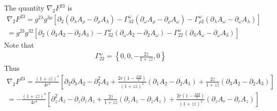 \documentclass[12pt]{article}
\def\nn{\nonumber}
\begin{document}
The quantity $\nabla_{2} F^{23}$ is
\begin{gather}
\nabla_{2}F^{23}
=
g^{2 \lambda} g^{3 \rho}
\left[
\partial_{2} 
(\partial_{\lambda}A_{\rho}
-
\partial_{\rho}A_{\lambda})
-
\Gamma_{\lambda 2}^{\omega} 
(\partial_{\omega} A_{\rho}
-
\partial_{\rho} A_{\omega})
-
\Gamma_{\rho 2}^{\omega}
(\partial_{\lambda} A_{\omega}
-
\partial_{\omega} A_{\lambda})
\right]
\nn \\
=
g^{23} g^{32}
\left[
\partial_{2} 
(\partial_{3}A_{2}
-
\partial_{2}A_{3})
-
\Gamma_{3 2}^{\omega} 
(\partial_{\omega} A_{2}
-
\partial_{2} A_{\omega})
-
\Gamma_{22}^{\omega}
(\partial_{3} A_{\omega}
-
\partial_{\omega} A_{3})
\right]
\end{gather}
Note that
\begin{gather}
\Gamma^{\omega}_{22}
=
\left\{
0,0,-\frac{2 \bar{z}}{1 + z \bar{z}},0
\right\}
\end{gather}
Thus
\begin{gather}
\nabla_{2}F^{23}
=
\frac{(1 + z \bar{z})^{4}}{4 r^{4}}
\left[
\partial_{2} \partial_{3}A_{2}
-
\partial_{2}^{2}A_{3}
+
\frac{2 r (1 - \frac{2 M}{r})}{(1 + z \bar{z})^{2}}
(\partial_{1} A_{2}
-
\partial_{2} A_{1})
+
\frac{2 \bar{z}}{1 + z \bar{z}}
(\partial_{3} A_{2}
-
\partial_{2} A_{3})
\right]
\nn \\
=
-
\frac{(1 + z \bar{z})^{4}}{4 r^{4}}
\left[
\partial_{z}^{2}A_{\bar{z}}
-
\partial_{z} \partial_{\bar{z}} A_{z}
+
\frac{2 \bar{z}}{1 + z \bar{z}}
(\partial_{z} A_{\bar{z}}
-
\partial_{\bar{z}} A_{z})
+
\frac{2 r (1 - \frac{2 M}{r})}{(1 + z \bar{z})^{2}}
(\partial_{z} A_{r}
-
\partial_{r} A_{z})
\right]
\end{gather}





\end{document}

